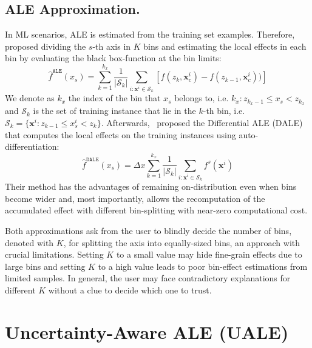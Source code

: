 \documentclass[twoside]{article}
\newcommand{\xc}{\mathbf{x}_c}
\newcommand{\xb}{\mathbf{x}}
\begin{document}
\subsection{ALE Approximation.}
\label{sec:ale-approximation}

In ML scenarios, ALE is estimated from the training set
examples. Therefore, \citep{apley2020visualizing} proposed dividing
the \(s\)-th axis in \(K\) bins and estimating the local effects in
each bin by evaluating the black box-function at the bin limits:
\begin{equation}
  \label{eq:ALE_accumulated_mean_est}
  \hat{f}^{\mathtt{ALE}}(x_s) = \sum_{k=1}^{k_x} \frac{1}{|\mathcal{S}_k|} \sum_{i:\mathbf{x}^i \in
    \mathcal{S}_k} \left [ f(z_{k}, \xc^i) - f(z_{k-1}, \xc^i)) \right ]
\end{equation}
We denote as \(k_x\) the index of the bin that \(x_s\) belongs to,
i.e. \(k_x: z_{k_x-1} \leq x_s < z_{k_x} \) and \(\mathcal{S}_k\) is
the set of training instance that lie in the \(k\)-th bin, i.e.
\( \mathcal{S}_k = \{ \xb^i : z_{k-1} \leq x^i_s < z_{k} \}
\). Afterwards,~\citep{gkolemis22} proposed the Differential ALE
(DALE) that computes the local effects on the training instances using
auto-differentiation:
\begin{equation}
  \label{eq:DALE_accumulated_mean_est}
  \hat{f}^{\mathtt{DALE}}(x_s) = \Delta x \sum_{k=1}^{k_x} \frac{1}{|\mathcal{S}_k|} \sum_{i:\mathbf{x}^i \in
    \mathcal{S}_k} f^s(\mathbf{x}^i)
\end{equation}
%
Their method has the advantages of remaining on-distribution even when
bins become wider and, most importantly, allows the recomputation of
the accumulated effect with different bin-splitting with near-zero
computational cost.

Both approximations ask from the user to blindly decide the number of
bins, denoted with \(K\), for splitting the axis into equally-sized
bins, an approach with crucial limitations. Setting \(K\) to a small
value may hide fine-grain effects due to large bins and setting \(K\)
to a high value leads to poor bin-effect estimations from limited
samples. In general, the user may face contradictory explanations for
different \(K\) without a clue to decide which one to trust.

\section{Uncertainty-Aware ALE (UALE)}
\label{sec:UALE}
\end{document}
